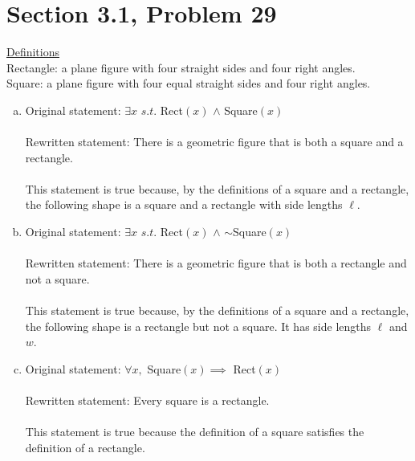 \documentclass{article}
\author{Nathan Stouffer}
\begin{document}
\section*{Section 3.1, Problem 29}
\underline{Definitions} \\
Rectangle: a plane figure with four straight sides and four right angles. \\
Square: a plane figure with four equal straight sides and four right angles.
\begin{enumerate}[(a)]
	\item Original statement: $\exists x$ $s.t.$ Rect$(x)$ $\wedge$ Square$(x)$ \\\\
	Rewritten statement: There is a geometric figure that is both a square and a rectangle. \\\\
	This statement is true because, by the definitions of a square and a rectangle, the following shape is a square and a rectangle with side lengths $\ell$. \\
	\begin{center}
	\end{center}
	
	\item Original statement: $\exists x$ $s.t.$ Rect$(x)$ $\wedge$ $\sim$Square$(x)$ \\\\
	Rewritten statement: There is a geometric figure that is both a rectangle and not a square. \\\\
	This statement is true because, by the definitions of a square and a rectangle, the following shape is a rectangle but not a square. It has side lengths $\ell$ and $w$. \\
	\begin{center}
	\end{center}

	\item Original statement: $\forall x,$ Square$(x) \implies$ Rect$(x)$ \\\\
	Rewritten statement: Every square is a rectangle. \\\\
	This statement is true because the definition of a square satisfies the definition of a rectangle.
	
\end{enumerate}
\end{document}
